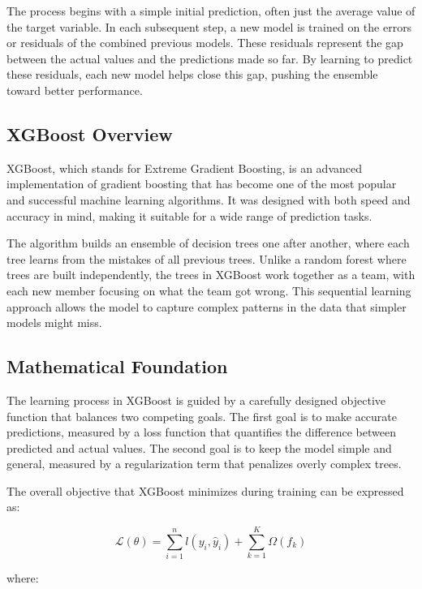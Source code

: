 \documentclass[12pt, a4paper]{report}
\numberwithin{equation}{chapter}
\begin{document}
The process begins with a simple initial prediction, often just the average value of the target variable. In each subsequent step, a new model is trained on the errors or residuals of the combined previous models. These residuals represent the gap between the actual values and the predictions made so far. By learning to predict these residuals, each new model helps close this gap, pushing the ensemble toward better performance.

\subsection{XGBoost Overview}

XGBoost, which stands for Extreme Gradient Boosting, is an advanced implementation of gradient boosting that has become one of the most popular and successful machine learning algorithms. It was designed with both speed and accuracy in mind, making it suitable for a wide range of prediction tasks.

The algorithm builds an ensemble of decision trees one after another, where each tree learns from the mistakes of all previous trees. Unlike a random forest where trees are built independently, the trees in XGBoost work together as a team, with each new member focusing on what the team got wrong. This sequential learning approach allows the model to capture complex patterns in the data that simpler models might miss.

\subsection{Mathematical Foundation}

The learning process in XGBoost is guided by a carefully designed objective function that balances two competing goals. The first goal is to make accurate predictions, measured by a loss function that quantifies the difference between predicted and actual values. The second goal is to keep the model simple and general, measured by a regularization term that penalizes overly complex trees.

The overall objective that XGBoost minimizes during training can be expressed as:

\begin{equation}
\mathcal{L}(\theta) = \sum_{i=1}^{n} l(y_i, \hat{y}_i) + \sum_{k=1}^{K} \Omega(f_k)
\label{eq:objective}
\end{equation}

where:
\end{document}
